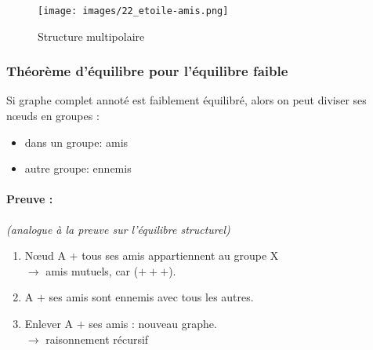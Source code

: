 \begin{figure}[h!]
	\centering
	\texttt{[image: images/22\_etoile-amis.png]}
	\label{fig:multipolaire}
	\caption{Structure multipolaire}
\end{figure}



\subsubsection*{Théorème d'équilibre pour l'équilibre faible}

Si graphe complet annoté est faiblement équilibré, alors on peut diviser ses nœuds en groupes :

\begin{itemize}


\item dans un groupe: amis

\item autre groupe: ennemis

\end{itemize}

\paragraph{Preuve : } \textit{(analogue à la preuve sur l'équilibre structurel)}


\begin{enumerate}

\item Nœud A + tous ses amis appartiennent au groupe X \\
$\to$ amis mutuels, car ($+++$).

\item A $+$ ses amis sont ennemis avec tous les autres.

\item Enlever A $+$ ses amis : nouveau graphe.\\
$\to$ raisonnement récursif

\end{enumerate}
